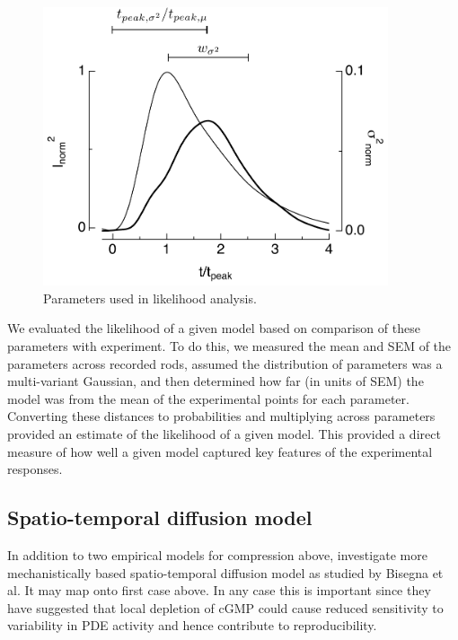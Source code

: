 \documentclass[12pt]{article}
\def\GCAPKO{GCAP$^{-/-}$}
\def\GCAPHET{GCAP$^{+/-}$}
\def\ArrHET{Arr$^{+/-}$}
\def\RKHET{GRK1$^{+/-}$}
\begin{document}
\begin{figure}[h]
\begin{center}
\includegraphics[width=4in]{params.pdf}
\caption{Parameters used in likelihood analysis.}  
\label{fig:likelihood-params}
\end{center}
\end{figure}


We evaluated the likelihood of a given model based on comparison of these parameters with experiment.  To do this, we measured the mean and SEM of the parameters across recorded rods, assumed the distribution of parameters was a multi-variant Gaussian, and then determined how far (in units of SEM) the model was from the mean of the experimental points for each parameter.  Converting these distances to probabilities and multiplying across parameters provided an estimate of the likelihood of a given model.  This provided a direct measure of how well a given model captured key features of the experimental responses.  


\subsection{Spatio-temporal diffusion model}

In addition to two empirical models for compression above, investigate more mechanistically based spatio-temporal diffusion model as studied by Bisegna et al.  It may map onto first case above.  In any case this is important since they have suggested that local depletion of cGMP could cause reduced sensitivity to variability in PDE activity and hence contribute to reproducibility.
\end{document}
